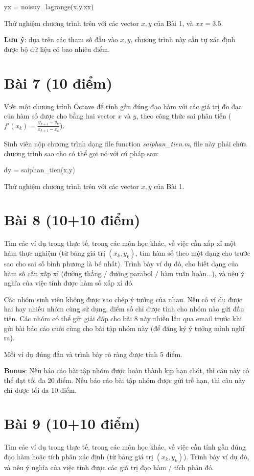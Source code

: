 \documentclass[12pt]{article}
\begin{document}
yx = noisuy\_lagrange(x,y,xx)

Thử nghiệm chương trình trên với các vector $x, y$ của Bài 1, và $xx=3.5$.

\textbf{Lưu ý}: dựa trên các tham số đầu vào $x, y$, chương trình này cần tự xác định được bộ dữ liệu có bao nhiêu điểm.

\section{Bài 7 (10 điểm)}
Viết một chương trình Octave để tính gần đúng đạo hàm với các giá trị đo đạc của hàm số được cho bằng hai vector $x$ và $y$, theo công thức sai phân tiến ($f'(x_k)=\frac{y_{k+1}-y_k}{x_{k+1}-x_k}$).

Sinh viên nộp chương trình dạng file function \emph{saiphan\_tien.m}, file này phải chứa chương trình sao cho có thể gọi nó với cú pháp sau:

dy = saiphan\_tien(x,y)

Thử nghiệm chương trình trên với các vector $x, y$ của Bài 1.

\section{Bài 8 (10+10 điểm)}
Tìm các ví dụ trong thực tế, trong các môn học khác, về việc cần xấp xỉ một hàm thực nghiệm (từ bảng giá trị $(x_k,y_k)$, tìm hàm số theo một dạng cho trước sao cho sai số bình phương là bé nhất). Trình bày ví dụ đó, cho biết dạng của hàm số cần xấp xỉ (đường thẳng / đường parabol / hàm tuần hoàn...), và nêu ý nghĩa của việc tính được hàm số xấp xỉ đó.

Các nhóm sinh viên không được sao chép ý tưởng của nhau. Nếu có ví dụ được hai hay nhiều nhóm cùng sử dụng, điểm số chỉ được tính cho nhóm nào gửi đầu tiên. Các nhóm có thể gửi giải đáp cho bài 8 này nhiều lần qua email trước khi gửi bài báo cáo cuối cùng cho bài tập nhóm này (để đăng ký ý tưởng mình nghĩ ra).

Mỗi ví dụ đúng đắn và trình bày rõ ràng được tính 5 điểm.

\textbf{Bonus}: Nếu báo cáo bài tập nhóm được hoàn thành kịp hạn chót, thì câu này có thể đạt tối đa 20 điểm. Nếu báo cáo bài tập nhóm được gửi trễ hạn, thì câu này chỉ được tối đa 10 điểm.

\section{Bài 9 (10+10 điểm)}
Tìm các ví dụ trong thực tế, trong các môn học khác, về việc cần tính gần đúng đạo hàm hoặc tích phân xác định (từ bảng giá trị $(x_k,y_k)$). Trình bày ví dụ đó, và nêu ý nghĩa của việc tính được các giá trị đạo hàm / tích phân đó.
\end{document}

